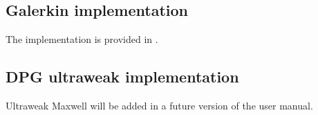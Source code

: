 \subsection{Galerkin implementation}
\label{subsec:maxwell-galerkin}

The implementation is provided in .

\subsection{DPG ultraweak implementation}
\label{subsec:maxwell-galerkin}

Ultraweak Maxwell will be added in a future version of the user manual.



%


